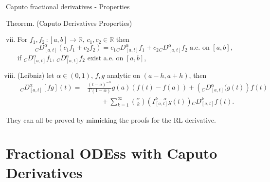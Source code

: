 \documentclass[aspectratio=169,xcolor=dvipsnames]{beamer}
\begin{document}
\begin{frame}{Caputo fractional derivatives - Properties}
\begin{alertblock}{Theorem. (Caputo Derivatives Properties)}
\begin{enumerate}[(i)]
	\setcounter{enumi}{6}
	\item For $f_1,f_2 \,:[a,b]\rightarrow \mathbb{R}$, $c_1,c_2 \in \mathbb{R}$ then
	\[
	{}_{C}{D_{[a,t]}^{\alpha}}(c_1 f_1 + c_2 f_2) = c_1 {}_{C}{D_{[a,t]}^{\alpha}}f_1 + c_2 {}_{C}{D_{[a,t]}^{\alpha}} f_2 \text{ a.e. on }[a,b], 
	\]
	if ${}_{C}{D_{[a,t]}^{\alpha}}f_1$, ${}_{C}{D_{[a,t]}^{\alpha}}f_2$ exist a.e. on $[a,b]$,
	\item \alert{(Leibniz)} let $\alpha \in (0,1)$, $f,g$ analytic on $(a-h,a+h)$, then
	\[
	\begin{split}
	{}_{C}{D_{[a,t]}^{\alpha}}[fg](t) = & \frac{(t-a)^{-\alpha}}{\Gamma(1-\alpha)}g(a)( f(t) - f(a)) + \left({}_{C}{D_{[a,t]}^{\alpha}}(g(t)\right)f(t) \\ & \qquad + \sum_{k=1}^{\infty} \binom{\alpha}{k} \left( I_{[a,t]}^{k-\alpha} g(t) \right) {}_{C}{D_{[a,t]}^{k}}f(t).
	\end{split}
	\]
\end{enumerate}
\end{alertblock}
They can all be proved by mimicking the proofs for the RL derivative.
\end{frame}



\section{Fractional ODEss with Caputo Derivatives}
\end{document}
